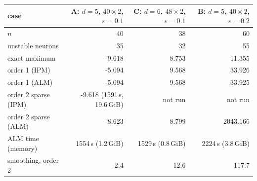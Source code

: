 \begin{tabular}{l r r r }\toprule
case & A: $d{=}5$, $40{\times}2$, $\varepsilon{=}0.1$ & C: $d{=}6$, $48{\times}2$, $\varepsilon{=}0.1$ & B: $d{=}5$, $40{\times}2$, $\varepsilon{=}0.2$ \\\midrule
$n$ & 40 & 38 & 60 \\
unstable neurons & 35 & 32 & 55 \\
exact maximum & -9.618 & 8.753 & 11.355 \\
order 1 (IPM) & -5.094 & 9.568 & 33.926 \\
order 1 (ALM) & -5.094 & 9.568 & 33.925 \\
order 2 sparse (IPM) & -9.618 (1591\,s, 19.6\,GiB) & not run & not run \\
order 2 sparse (ALM) & -8.623 & 8.799 & 2043.166 \\
ALM time (memory) & 1554\,s (1.2\,GiB) & 1529\,s (0.8\,GiB) & 2224\,s (3.8\,GiB) \\
smoothing, order 2 & -2.4 & 12.6 & 117.7 \\
\bottomrule\end{tabular}
